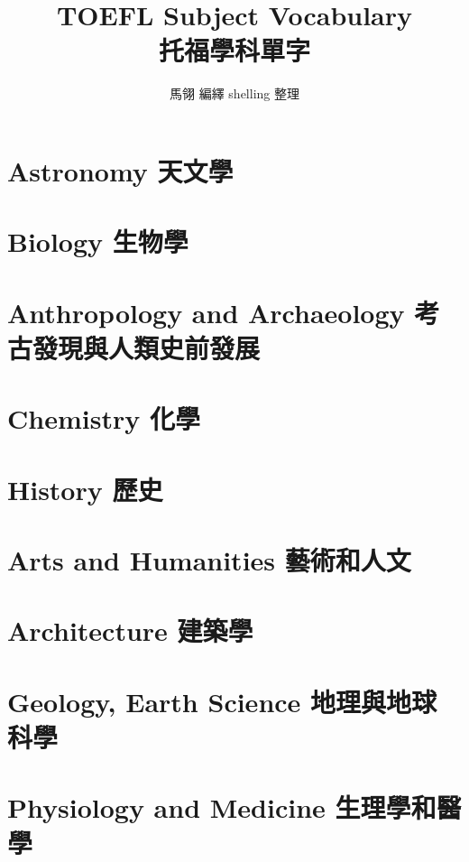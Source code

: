\documentclass[b5paper]{book}
\begin{document}
  \title{TOEFL Subject Vocabulary\\\kai 托福學科單字}
  \author{\kai 馬翎 編繹 shelling 整理\rm}
  \maketitle

  \tableofcontents %

  \chapter{Astronomy \kai 天文學}


  \chapter{Biology \kai 生物學}

  \chapter{Anthropology and Archaeology \kai 考古發現與人類史前發展}

  \chapter{Chemistry \kai 化學}

  \chapter{History \kai 歷史}

  \chapter{Arts and Humanities \kai 藝術和人文}

  \chapter{Architecture \kai 建築學}

  \chapter{Geology, Earth Science \kai 地理與地球科學}

  \chapter{Physiology and Medicine \kai 生理學和醫學}
\end{document}
